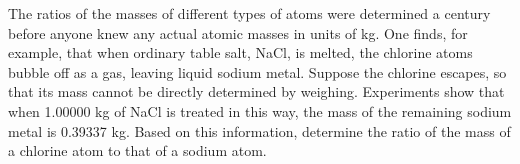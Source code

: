        The ratios of the masses of different types of atoms were determined a century
        before anyone knew any actual atomic masses in units of kg. One finds, for example,
        that when ordinary table salt, NaCl, is melted, the chlorine atoms bubble off as a
        gas, leaving liquid sodium metal. Suppose the chlorine escapes, so that
        its mass cannot be directly determined by weighing. Experiments show that when 1.00000 kg
        of NaCl is treated in this way, the mass of the remaining sodium metal is 0.39337 kg.
        Based on this information, determine the ratio of the mass of a chlorine atom
        to that of a sodium atom.\answercheck
